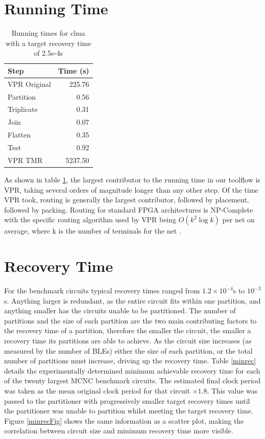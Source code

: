 \documentclass[12pt,final,oneside]{dwThesis} %
\begin{document}
   \section{Running Time}\label{timing}
   
   \begin{table}
      \begin{center}
   \begin{tabular}{lr}
	\toprule
   	Step & Time (s) \\
   	\midrule
   	VPR Original & 225.76\\
   	Partition & 0.56 \\
   	Triplicate & 0.31 \\
   	Join & 0.07 \\
   	Flatten & 0.35 \\
   	Test & 0.92 \\
   	VPR TMR & 5237.50\\
   	\bottomrule
   \end{tabular}
   \caption{Running times for clma with a target recovery time of 2.5e-4s}\label{runningtimes}
   \end{center}\end{table}
   As shown in table \ref{runningtimes}, the largest contributor to the running time in our toolflow is \gls{VPR}, taking several orders of magnitude longer than any other step. Of the time \gls{VPR} took, routing is generally the largest contributor, followed by placement, followed by packing.
   Routing for standard \gls{FPGA} architectures is NP-Complete \cite{npcomplete} with the specific routing algorithm used by \gls{VPR} being $O(k^2\log{k})$ per net on average,
   where k is the number of terminals for the net \cite{VPRBook}.
   


   \section{Recovery Time}
    For the benchmark circuits typical recovery times ranged from $1.2\times10^{-4}$s to $10^{-3}$s. Anything larger is redundant, as the entire circuit fits within one partition, and anything smaller has the circuits unable to be partitioned. The number of partitions and the size of each partition are the two main contributing factors to the recovery time of a partition, therefore the smaller the circuit, the smaller a recovery time its partitions are able to achieve. As the circuit size increases (as measured by the number of \glspl{BLE}) either the size of each partition, or the total number of partitions must increase, driving up the recovery time.
    Table \ref{minrec} details the experimentally determined minimum achievable recovery time for each of the twenty largest \gls{MCNC} benchmark circuits. The estimated final clock period was taken as the mean original clock period for that circuit $\times 1.8$. This value was passed to the partitioner with progressively smaller target recovery times until the partitioner was unable to partition whilst meeting the target recovery time.
    Figure \ref{minrecFig} shows the same information as a scatter plot, making the correlation between circuit size and minimum recovery time more visible.
    
\end{document}
